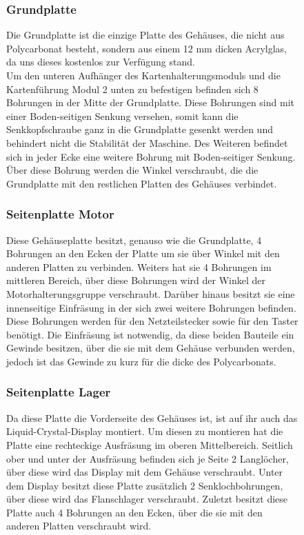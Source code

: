 \begin{figure}
\subsubsection{Grundplatte}
Die Grundplatte ist die einzige Platte des Gehäuses, die nicht aus Polycarbonat besteht, sondern aus einem 12 mm dicken
Acrylglas, da uns dieses kostenlos zur Verfügung stand.\\
Um den unteren Aufhänger des Kartenhalterungsmoduls und die Kartenführung Modul 2 unten zu befestigen befinden sich 8
Bohrungen in der Mitte der Grundplatte. Diese Bohrungen sind mit einer Boden-seitigen Senkung versehen, somit kann die
Senkkopfschraube ganz in die Grundplatte gesenkt werden und behindert nicht die Stabilität der Maschine.
Des Weiteren befindet sich in jeder Ecke eine weitere Bohrung mit Boden-seitiger Senkung. Über diese Bohrung werden die
Winkel verschraubt, die die Grundplatte mit den restlichen Platten des Gehäuses verbindet.

\subsubsection{Seitenplatte Motor}
Diese Gehäuseplatte besitzt, genauso wie die Grundplatte, 4 Bohrungen an den Ecken der Platte um sie über Winkel
mit den anderen Platten zu verbinden. Weiters hat sie 4 Bohrungen im mittleren Bereich, über diese Bohrungen wird
der Winkel der Motorhalterungsgruppe verschraubt. Darüber hinaus besitzt sie eine innenseitige Einfräsung in der sich
zwei weitere Bohrungen befinden. Diese Bohrungen werden für den Netzteilstecker sowie für den Taster benötigt.
Die Einfräsung ist notwendig, da diese beiden Bauteile ein Gewinde besitzen, über die sie mit dem Gehäuse verbunden werden,
jedoch ist das Gewinde zu kurz für die dicke des Polycarbonats.

\subsubsection{Seitenplatte Lager}
Da diese Platte die Vorderseite des Gehäuses ist, ist auf ihr auch das Liquid-Crystal-Display montiert. Um diesen zu montieren
hat die Platte eine rechteckige Ausfräsung im oberen Mittelbereich. Seitlich ober und unter der Ausfräsung befinden sich
je Seite 2 Langlöcher, über diese wird das Display mit dem Gehäuse verschraubt.
Unter dem Display besitzt diese Platte zusätzlich 2 Senklochbohrungen, über diese wird das Flanschlager verschraubt.
Zuletzt besitzt diese Platte auch 4 Bohrungen an den Ecken, über die sie mit den anderen Platten verschraubt wird.


\end{figure}
